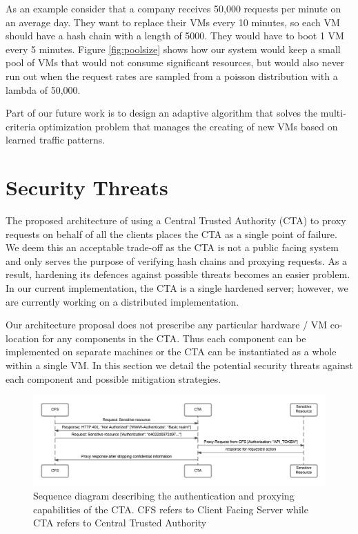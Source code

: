 \documentclass[a4paper,twoside]{article}
\begin{document}
As an example consider that a company receives 50,000 requests per minute on an average day.  They want to replace their VMs every 10 minutes, so each VM should have a hash chain with a length of 5000.   They would have to boot 1 VM every 5 minutes.  Figure \ref{fig:poolsize} shows how our system would keep a small pool of VMs that would not consume significant resources, but would also never run out when the request rates are sampled from a poisson distribution with a lambda of 50,000.


Part of our future work is to design an adaptive algorithm that solves the multi-criteria optimization problem that manages the creating of new VMs based on learned traffic patterns.

\section{Security Threats}

The proposed architecture of using a Central Trusted Authority (CTA) to proxy requests on behalf of all the clients places the CTA as a single point of failure. We deem this an acceptable trade-off as the CTA is not a public facing system and only serves the purpose of verifying hash chains and proxying requests.  As a result, hardening its defences against possible threats becomes an easier problem.  In our current implementation, the CTA is a single hardened server; however, we are currently working on a distributed implementation.

Our architecture proposal does not prescribe any particular hardware / VM co-location for any components in the CTA. Thus each component can be implemented on separate machines or the CTA can be instantiated as a whole within a single VM. In this section we detail the potential security threats against each component and possible mitigation strategies.

\begin{figure}[!ht]
  \centering
  \includegraphics[keepaspectratio=true,scale=0.70]{sequence_diagram}
  \caption{Sequence diagram describing the authentication and proxying capabilities of the CTA. CFS refers to Client Facing Server while CTA refers to Central Trusted Authority}
  \label{fig:ctaarchitecture}
\end{figure}
\end{document}
